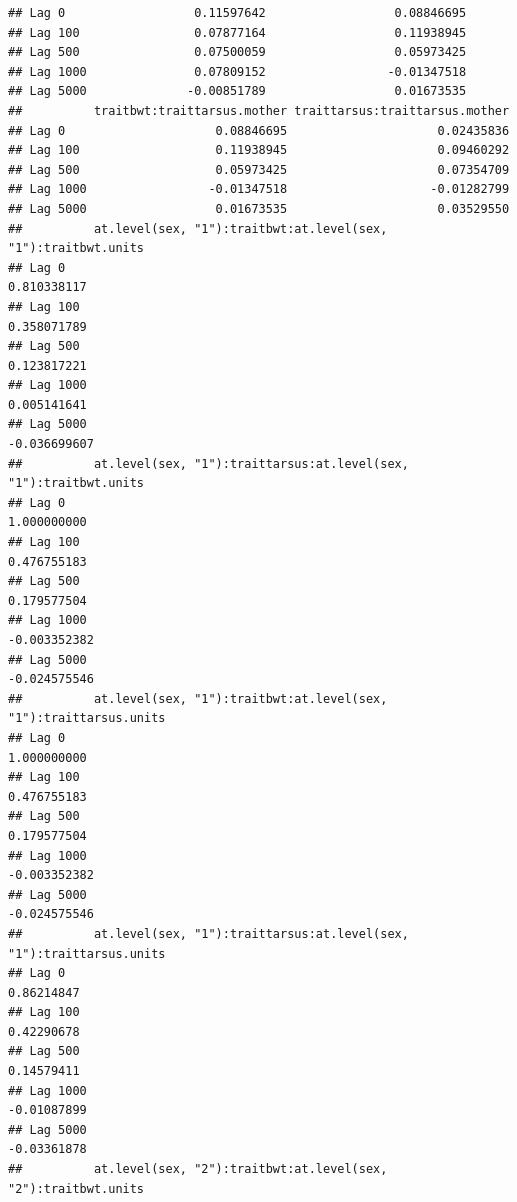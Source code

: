 \documentclass[
  12pt,
]{book}
\begin{document}
\begin{verbatim}
## Lag 0                  0.11597642                  0.08846695
## Lag 100                0.07877164                  0.11938945
## Lag 500                0.07500059                  0.05973425
## Lag 1000               0.07809152                 -0.01347518
## Lag 5000              -0.00851789                  0.01673535
##          traitbwt:traittarsus.mother traittarsus:traittarsus.mother
## Lag 0                     0.08846695                     0.02435836
## Lag 100                   0.11938945                     0.09460292
## Lag 500                   0.05973425                     0.07354709
## Lag 1000                 -0.01347518                    -0.01282799
## Lag 5000                  0.01673535                     0.03529550
##          at.level(sex, "1"):traitbwt:at.level(sex, "1"):traitbwt.units
## Lag 0                                                      0.810338117
## Lag 100                                                    0.358071789
## Lag 500                                                    0.123817221
## Lag 1000                                                   0.005141641
## Lag 5000                                                  -0.036699607
##          at.level(sex, "1"):traittarsus:at.level(sex, "1"):traitbwt.units
## Lag 0                                                         1.000000000
## Lag 100                                                       0.476755183
## Lag 500                                                       0.179577504
## Lag 1000                                                     -0.003352382
## Lag 5000                                                     -0.024575546
##          at.level(sex, "1"):traitbwt:at.level(sex, "1"):traittarsus.units
## Lag 0                                                         1.000000000
## Lag 100                                                       0.476755183
## Lag 500                                                       0.179577504
## Lag 1000                                                     -0.003352382
## Lag 5000                                                     -0.024575546
##          at.level(sex, "1"):traittarsus:at.level(sex, "1"):traittarsus.units
## Lag 0                                                             0.86214847
## Lag 100                                                           0.42290678
## Lag 500                                                           0.14579411
## Lag 1000                                                         -0.01087899
## Lag 5000                                                         -0.03361878
##          at.level(sex, "2"):traitbwt:at.level(sex, "2"):traitbwt.units

\end{verbatim}
\end{document}
